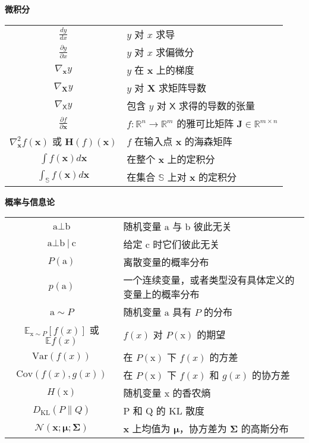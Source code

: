 \begin{center}
  {\Large\bfseries 微积分}\\
  \vspace{1em}
  \begin{tabular}{c l}
    $\frac{dy}{dx}$ & $y$ 对 $x$ 求导 \\
    $\frac{\partial y}{\partial x}$ & $y$ 对 $x$ 求偏微分 \\
    $\nabla_{\pmb{x}}y$ & $y$ 在 $\pmb{x}$ 上的梯度 \\
    $\nabla_{\pmb{X}}y$ & $y$ 对 $\pmb{X}$ 求矩阵导数 \\
    $\nabla_{\pmb{\mathsf{X}}}y$ & 包含 $y$ 对 $\pmb{\mathsf{X}}$ 求得的导数的张量 \\
    $\frac{\partial f}{\partial \pmb{x}}$ & $f : \mathbb{R}^n \rightarrow \mathbb{R}^m$ 的雅可比矩阵 $\pmb{J} \in \mathbb{R}^{m \times n}$ \\
    $\nabla^2_{\pmb{x}}f(\pmb{x})$ 或 $\pmb{H}(f)(\pmb{x})$ & $f$ 在输入点 $\pmb{x}$ 的海森矩阵\\
    $\int f(\pmb{x})d\pmb{x}$ & 在整个 $\pmb{x}$ 上的定积分\\
    $\int_{\mathbb{S}} f(\pmb{x})d\pmb{x}$ & 在集合 $\mathbb{S}$ 上对 $\pmb{x}$ 的定积分 \\
  \end{tabular}
\end{center}

\vspace{1em}

\begin{center}
  {\Large\bfseries 概率与信息论}\\
  \vspace{1em}
  \begin{tabular}{c l}
    $\mathrm{a} \bot \mathrm{b}$ & 随机变量 $\mathrm{a}$ 与 $\mathrm{b}$ 彼此无关 \\
    $\mathrm{a} \bot \mathrm{b}\: | \: \mathrm{c}$ & 给定 $\mathrm{c}$ 时它们彼此无关 \\
    $P(\mathrm{a})$ & 离散变量的概率分布 \\
    $p(\mathrm{a})$ & 一个连续变量，或者类型没有具体定义的变量上的概率分布 \\
    $\mathrm{a} \sim P$ & 随机变量 $\mathrm{a}$ 具有 $P$ 的分布 \\
    $\mathbb{E}_{\mathrm{x} \sim P} [f(x)]$ 或 $\mathbb{E}f(x)$ & $f(x)$ 对 $P(\mathrm{x})$ 的期望 \\
    $\mathrm{Var}(f(x))$ & 在 $P(\mathrm{x})$ 下 $f(x)$ 的方差 \\
    $\mathrm{Cov}(f(x),g(x))$ & 在 $P(\mathrm{x})$ 下 $f(x)$ 和 $g(x)$ 的协方差 \\
    $H(\mathrm{x})$ & 随机变量 $\mathrm{x}$ 的香农熵 \\
    $D_{\mathrm{KL}}(P \parallel Q)$ & $\mathrm{P}$ 和 $\mathrm{Q}$ 的 $\mathrm{KL}$ 散度 \\
    $\mathcal{N}(\pmb{x};\pmb{\mu};\pmb{\Sigma})$ & $\pmb{x}$ 上均值为 $\pmb{\mu}$，协方差为 $\pmb{\Sigma}$ 的高斯分布 \\
  \end{tabular}
\end{center}

